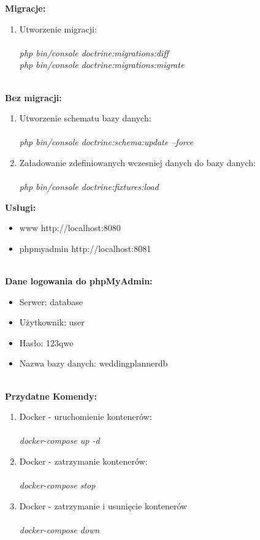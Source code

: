 \documentclass{article}
\begin{document}
\textbf{Migracje:}\\
\begin{enumerate}
\item Utworzenie migracji: \\\\
 \emph{php bin/console doctrine:migrations:diff} \\
 \emph{php bin/console doctrine:migrations:migrate} \\\\
  \end{enumerate}
 \textbf{Bez migracji:}\\
 \begin{enumerate}
\item Utworzenie schematu bazy danych: \\\\
 \emph{php bin/console doctrine:schema:update --force} \\
 \item Załadowanie zdefiniowanych wczesniej danych do bazy danych: \\\\
 \emph{php bin/console doctrine:fixtures:load} \\
 \end{enumerate}






\textbf{Usługi:}
    \begin{itemize}
        \item www http://localhost:8080
        \item phpmyadmin http://localhost:8081 \\\\
    \end{itemize}
    
    
    \textbf{Dane logowania do phpMyAdmin:}
     \begin{itemize}
        \item Serwer: database
        \item Użytkownik: user
        \item Hasło: 123qwe
        \item Nazwa bazy danych: weddingplannerdb \\\\
    \end{itemize}
\textbf{Przydatne Komendy:}\\
\begin{enumerate}
\item Docker - uruchomienie kontenerów: \\\\
 \emph{docker-compose up -d} \\
 \item Docker - zatrzymanie kontenerów: \\\\
 \emph{docker-compose stop} \\
 \item Docker - zatrzymanie i usunięcie kontenerów \\\\
 \emph{docker-compose down} \\
  \end{enumerate}
    
\end{document}
